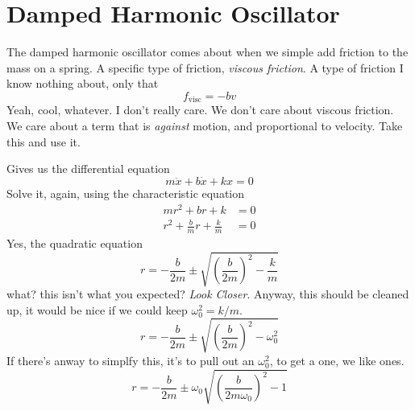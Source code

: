 \documentclass{article}
\begin{document}
\section{Damped Harmonic Oscillator}
The damped harmonic oscillator comes about when we simple add friction to the mass on a spring. A specific type of friction, \textit{viscous friction}. A type of friction I know nothing about, only that 
\begin{equation*}
    f_\mathrm{visc} = -bv
\end{equation*}
Yeah, cool, whatever. I don't really care. We don't care about viscous friction. We care about a term that is \textit{against} motion, and proportional to velocity. 
Take this and use it.
\begin{center}
\end{center}
Gives us the differential equation
\begin{equation*}
    m\ddot{x} + b\dot{x} + kx = 0
\end{equation*}
Solve it, again, using the characteristic equation
\begin{align*}
    mr^2 + br + k &= 0 \\ 
    r^2 + \frac{b}{m}r + \frac{k}{m} &= 0
\end{align*} 
Yes, the quadratic equation
\begin{equation*}
    r = - \frac{b}{2m} \pm \sqrt{\left(\frac{b}{2m}\right)^{\!2} - \frac{k}{m}}
\end{equation*}
what? this isn't what you expected? \textit{Look Closer}. Anyway, this should be cleaned up, it would be nice if we could keep $\omega_0^2 = k/m$.
\begin{equation*}
    r = - \frac{b}{2m} \pm \sqrt{\left(\frac{b}{2m}\right)^{\!2} - \omega_0^2}
\end{equation*}
If there's anway to simplfy this, it's to pull out an $\omega_0^2$, to get a one, we like ones.
\begin{equation*}
    r = - \frac{b}{2m} \pm \omega_0\sqrt{\left(\frac{b}{2m\omega_0}\right)^{\!2} - 1}
\end{equation*}
\end{document}
